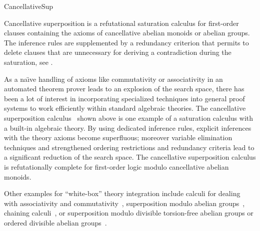 \begin{entry}{CancellativeSup}
\begin{calculus}
\end{calculus}



\begin{clarifications}
Cancellative superposition is a refutational saturation calculus for
first-order clauses containing the axioms of
cancellative abelian monoids or abelian groups.
The inference rules are supplemented by a redundancy criterion
that permits to delete clauses that are unnecessary for
deriving a contradiction during the saturation, see .
\end{clarifications}

\begin{history}
As a na{\"\i}ve handling of axioms like commutativity or associativity
in an automated theorem prover
leads to an explosion of the search space,
there has been a lot of interest in
incorporating specialized techniques into general proof systems
to work efficiently within standard algebraic theories.
The cancellative superposition calculus~\cite{GanzingerWaldmann1996CADE}
shown above
is one example of a saturation calculus with a built-in algebraic theory.
By using dedicated inference rules,
explicit inferences with the theory axioms become superfluous;
moreover variable elimination techniques
and strengthened ordering restrictions and redundancy criteria
lead to a significant reduction of the search space.
The cancellative superposition calculus is refutationally complete for
first-order logic modulo cancellative abelian monoids.

Other examples for ``white-box'' theory integration include
calculi for dealing with associativity and
commutativity~\cite{Plotkin1972,Slagle1974JACM,RusinowitchVigneron1995,BachmairGanzinger1994CTRS},
superposition modulo abelian groups~\cite{GodoyNieuwenhuis2004},
chaining calculi~\cite{Slagle1972JACM,Hines1992JAR,BachmairGanzinger1994LICS,BachmairGanzinger1994CADE},
or superposition modulo
divisible torsion-free abelian groups
or ordered divisible abelian groups~\cite{Waldmann2002abJSC,Waldmann2001IJCAR}.

\end{history}














\end{entry}
